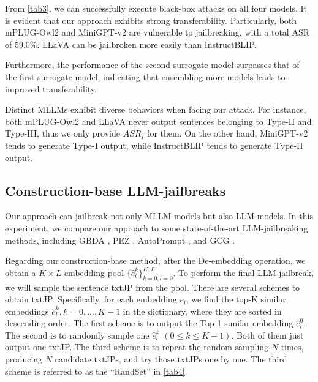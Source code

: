 From \cref{tab3}, we can successfully execute black-box attacks on all four models. It is evident that our approach exhibits strong transferability. Particularly, both mPLUG-Owl2 and MiniGPT-v2 are vulnerable to jailbreaking, with a total ASR of $59.0\%$. LLaVA can be jailbroken more easily than InstructBLIP. %

Furthermore, the performance of the second surrogate model surpasses that of the first surrogate model, indicating that ensembling more models leads to improved transferability.

Distinct MLLMs exhibit diverse behaviors when facing our attack. For instance, both mPLUG-Owl2 and LLaVA never output sentences belonging to Type-II and Type-III, thus we only provide $ASR_I$ for them. On the other hand, MiniGPT-v2 tends to generate Type-I output, while InstructBLIP tends to generate Type-II output. 

\subsection{Construction-base LLM-jailbreaks}
Our approach can jailbreak not only MLLM models but also LLM models. In this experiment, we compare our approach to some state-of-the-art LLM-jailbreaking methods, including GBDA \cite{guo2021gradient}, PEZ \cite{wen2023hard}, AutoPrompt \cite{shin2020autoprompt}, and GCG \cite{zou2023universal}. 

Regarding our construction-base method, after the De-embedding operation, we obtain a $K\times L$ embedding pool $\{\hat{e}_l^k\}_{k=0,l=0}^{K, L}$. To perform the final LLM-jailbreak, we will sample the sentence txtJP from the pool. There are several schemes to obtain txtJP. Specifically, for each embedding $e_l$, we find the top-K similar embeddings $\hat{e}^k_l, k=0,...,K-1$ in the dictionary, where they are sorted in descending order. The first scheme is to output the Top-1 similar embedding $\hat{e}^0_l$. The second is to randomly sample one $\hat{e}^k_l$ $(0\le k \le K-1)$. Both of them just output one txtJP. The third scheme is to repeat the random sampling $N$ times, producing $N$ candidate txtJPs, and try those txtJPs one by one. The third scheme is referred to as the ``RandSet'' in \cref{tab4}.

